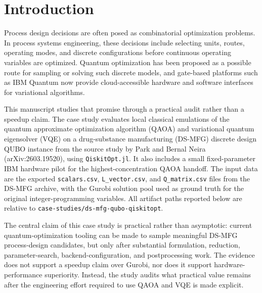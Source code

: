 
\section{Introduction}
\label{sec:ds-mfg-introduction}

Process design decisions are often posed as combinatorial optimization
problems. In process systems engineering, these decisions include selecting
units, routes, operating modes, and discrete configurations before continuous
operating variables are optimized. Quantum optimization has been proposed as a
possible route for sampling or solving such discrete models, and gate-based
platforms such as IBM Quantum now provide cloud-accessible hardware and
software interfaces for variational algorithms.

This manuscript studies that promise through a practical audit rather than a
speedup claim. The case study evaluates local classical emulations of the
quantum approximate optimization algorithm (QAOA) and variational quantum
eigensolver (VQE) on a drug-substance manufacturing (DS-MFG) discrete design
QUBO instance from the source study by Park and Bernal Neira
(arXiv:2603.19520), using \texttt{QiskitOpt.jl}. It also includes a small
fixed-parameter IBM hardware pilot for the highest-concentration QAOA handoff. The input
data are the exported \texttt{scalars.csv}, \texttt{L\_vector.csv}, and
\texttt{Q\_matrix.csv} files from the DS-MFG archive, with the Gurobi solution
pool used as ground truth for the original integer-programming variables. All
artifact paths reported below are relative to
\texttt{case-studies/ds-mfg-qubo-qiskitopt}.

The central claim of this case study is practical rather than asymptotic:
current quantum-optimization tooling can be made to sample meaningful
DS-MFG process-design candidates, but only after substantial formulation,
reduction, parameter-search, backend-configuration, and postprocessing work.
The evidence does not support a speedup claim over Gurobi, nor does it support
hardware-performance superiority. Instead, the study audits what practical
value remains after the engineering effort required to use QAOA and VQE is made
explicit.

